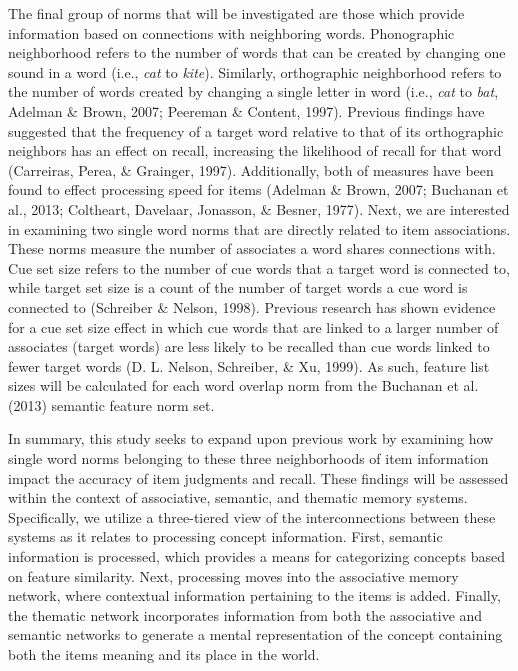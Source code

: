 \documentclass[english,man]{apa6}
\theoremstyle{definition}
\theoremstyle{definition}
\theoremstyle{definition}
\theoremstyle{remark}
\begin{document}
The final group of norms that will be investigated are those which
provide information based on connections with neighboring words.
Phonographic neighborhood refers to the number of words that can be
created by changing one sound in a word (i.e., \emph{cat} to
\emph{kite}). Similarly, orthographic neighborhood refers to the number
of words created by changing a single letter in word (i.e., \emph{cat}
to \emph{bat}, Adelman \& Brown, 2007; Peereman \& Content, 1997).
Previous findings have suggested that the frequency of a target word
relative to that of its orthographic neighbors has an effect on recall,
increasing the likelihood of recall for that word (Carreiras, Perea, \&
Grainger, 1997). Additionally, both of measures have been found to
effect processing speed for items (Adelman \& Brown, 2007; Buchanan et
al., 2013; Coltheart, Davelaar, Jonasson, \& Besner, 1977). Next, we are
interested in examining two single word norms that are directly related
to item associations. These norms measure the number of associates a
word shares connections with. Cue set size refers to the number of cue
words that a target word is connected to, while target set size is a
count of the number of target words a cue word is connected to
(Schreiber \& Nelson, 1998). Previous research has shown evidence for a
cue set size effect in which cue words that are linked to a larger
number of associates (target words) are less likely to be recalled than
cue words linked to fewer target words (D. L. Nelson, Schreiber, \& Xu,
1999). As such, feature list sizes will be calculated for each word
overlap norm from the Buchanan et al. (2013) semantic feature norm set.

In summary, this study seeks to expand upon previous work by examining
how single word norms belonging to these three neighborhoods of item
information impact the accuracy of item judgments and recall. These
findings will be assessed within the context of associative, semantic,
and thematic memory systems. Specifically, we utilize a three-tiered
view of the interconnections between these systems as it relates to
processing concept information. First, semantic information is
processed, which provides a means for categorizing concepts based on
feature similarity. Next, processing moves into the associative memory
network, where contextual information pertaining to the items is added.
Finally, the thematic network incorporates information from both the
associative and semantic networks to generate a mental representation of
the concept containing both the items meaning and its place in the
world.
\end{document}
